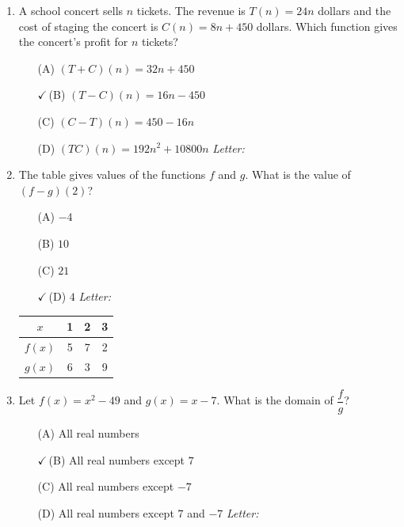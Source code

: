 \documentclass[10pt]{article}
\begin{document}
\begin{enumerate}[leftmargin=1.9em, itemsep=12pt]

\item A school concert sells $n$ tickets. The revenue is $T(n) = 24n$ dollars and the cost of
      staging the concert is $C(n) = 8n + 450$ dollars. Which function gives the concert's
      profit for $n$ tickets?
      \begin{enumerate}[leftmargin=2.6em, itemsep=2pt]
        \item[(A)] $(T + C)(n) = 32n + 450$
        \item[{\color{keyred}$\checkmark$\,(B)}] $(T - C)(n) = 16n - 450$
        \item[(C)] $(C - T)(n) = 450 - 16n$
        \item[(D)] $(TC)(n) = 192n^2 + 10800n$ \hfill\textit{Letter:}~\gradedblank[id=ap1, type=choice, points=1, answer=B]{0.42in}{13pt}
      \end{enumerate}

\item \begin{minipage}[t]{0.52\linewidth}
      The table gives values of the functions $f$ and $g$. What is the value of $(f - g)(2)$?
      \begin{enumerate}[leftmargin=2.6em, itemsep=2pt]
        \item[(A)] $-4$
        \item[(B)] $10$
        \item[(C)] $21$
        \item[{\color{keyred}$\checkmark$\,(D)}] $4$ \hfill\textit{Letter:}~\gradedblank[id=ap2, type=choice, points=1, answer=D]{0.42in}{13pt}
      \end{enumerate}
      \end{minipage}\hfill
      \begin{minipage}[t]{0.42\linewidth}
      \vspace{-2pt}
      \centering
      {\renewcommand{\arraystretch}{1.3}
      \begin{tabular}{|c|c|c|c|}
      \hline
      $x$    & 1 & 2 & 3 \\ \hline
      $f(x)$ & 5 & 7 & 2 \\ \hline
      $g(x)$ & 6 & 3 & 9 \\ \hline
      \end{tabular}}
      \end{minipage}

\item Let $f(x) = x^2 - 49$ and $g(x) = x - 7$. What is the domain of $\dfrac{f}{g}$?
      \begin{enumerate}[leftmargin=2.6em, itemsep=2pt]
        \item[(A)] All real numbers
        \item[{\color{keyred}$\checkmark$\,(B)}] All real numbers except $7$
        \item[(C)] All real numbers except $-7$
        \item[(D)] All real numbers except $7$ and $-7$ \hfill\textit{Letter:}~\gradedblank[id=ap3, type=choice, points=1, answer=B]{0.42in}{13pt}
      \end{enumerate}


\end{enumerate}
\end{document}
